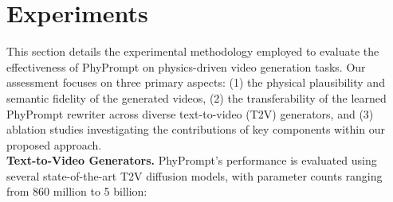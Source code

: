 \section{Experiments}

This section details the experimental methodology employed to evaluate the effectiveness of PhyPrompt on physics-driven video generation tasks. Our assessment focuses on three primary aspects: (1) the physical plausibility and semantic fidelity of the generated videos, (2) the transferability of the learned PhyPrompt rewriter across diverse text-to-video (T2V) generators, and (3) ablation studies investigating the contributions of key components within our proposed approach.
\\
\textbf{Text-to-Video Generators.}
PhyPrompt's performance is evaluated using several state-of-the-art T2V diffusion models, with parameter counts ranging from 860 million to 5 billion:


